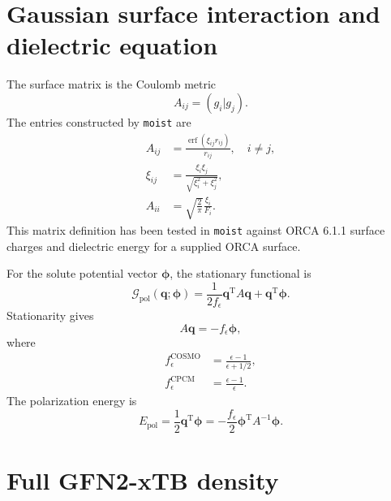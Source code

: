 \documentclass[11pt,a4paper]{article}
\newcommand{\vect}[1]{\bm{#1}}
\newcommand{\erf}{\operatorname{erf}}
\begin{document}
\section{Gaussian surface interaction and dielectric equation}

The surface matrix is the Coulomb metric
\begin{equation}
 A_{ij}=(g_i|g_j).
\end{equation}
The entries constructed by \texttt{moist} are
\begin{align}
 A_{ij}&=\frac{\erf(\xi_{ij}r_{ij})}{r_{ij}},\quad i\ne j,\\
 \xi_{ij}&=\frac{\xi_i\xi_j}{\sqrt{\xi_i^2+\xi_j^2}},\\
 A_{ii}&=\sqrt{\frac{2}{\pi}}\frac{\xi_i}{F_i}.
\end{align}
This matrix definition has been tested in \texttt{moist} against ORCA 6.1.1
surface charges and dielectric energy for a supplied ORCA surface.

For the solute potential vector $\vect{\phi}$, the stationary functional is
\begin{equation}
 \mathcal G_{\mathrm{pol}}(\vect q;\vect\phi)
 =\frac{1}{2f_\epsilon}\vect q^{\mathrm T}A\vect q
  +\vect q^{\mathrm T}\vect\phi.
\end{equation}
Stationarity gives
\begin{equation}
 A\vect q=-f_\epsilon\vect\phi,
\end{equation}
where
\begin{align}
 f_\epsilon^{\mathrm{COSMO}}&=\frac{\epsilon-1}{\epsilon+1/2},\\
 f_\epsilon^{\mathrm{CPCM}}&=\frac{\epsilon-1}{\epsilon}.
\end{align}
The polarization energy is
\begin{equation}
 E_{\mathrm{pol}}=\frac12\vect q^{\mathrm T}\vect\phi
 =-\frac{f_\epsilon}{2}\vect\phi^{\mathrm T}A^{-1}\vect\phi.
 \label{eq:epol}
\end{equation}

\section{Full GFN2-xTB density}
\end{document}
